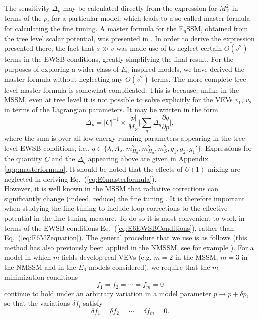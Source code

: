 \documentclass[preprint,amsmath,amssymb,aps,superscriptaddress,prd,showpacs,floatfix,nofootinbib]{revtex4-1}
\newcommand{\be}{\begin{equation}}
\newcommand{\ee}{\end{equation}}
\begin{document}
The sensitivity $\Delta_p$ may be calculated directly
from the expression for $M_Z^2$ in terms of the $p_i$ for a particular
model, which leads to a so-called master formula for calculating the
fine tuning. A master formula for the E$_6$SSM, obtained from the tree
level scalar potential, was presented in \cite{Athron:2013ipa}. In
order to derive the expression presented there, the fact that $s \gg
v$ was made use of to neglect certain $O(v^2)$ terms in the EWSB
conditions, greatly simplifying the final result. For the purposes of
exploring a wider class of $E_6$ inspired models, we have derived
the master formula without neglecting any $O(v^2)$ terms. The more
complete tree-level master formula is somewhat complicated. This is
because, unlike in the MSSM, even at tree level it is not possible to
solve explicitly for the VEVs $v_1$, $v_2$ in terms of the Lagrangian
parameters. It may be written in the form \be \Delta_p=|C|^{-1}\times
\frac{|p|}{M_Z}\bigg|\sum_{q}\tilde{\Delta}_q\frac{\partial
  q}{\partial p}\bigg|,
\label{eq:E6masterformula}
\ee where the sum is over all low energy running parameters appearing
in the tree level EWSB conditions, i.e., $q\in\{\lambda, A_\lambda,
m_{H_d}^2,m_{H_u}^2,m_S^2,g_1,g_2,g_1'\}$. Expressions for the
quantity $C$ and the $\tilde{\Delta}_q$ appearing above are given in
Appendix \ref{app:masterformula}. It should be noted that the effects
of $U(1)$ mixing are neglected in deriving
Eq.~(\ref{eq:E6masterformula}).\\
However, it is well known in the
MSSM that radiative corrections can significantly change (indeed,
reduce) the fine tuning \cite{Cassel:2010px}. It is therefore
important when studying the fine tuning to include loop corrections to
the effective potential in the fine tuning measure. To do so it is
most convenient to work in terms of the EWSB conditions
Eq.~(\ref{eq:E6EWSBConditions}), rather than
Eq.~(\ref{eq:E6MZequation}). The general procedure that we use is as follows
(this method has also previously been applied in the NMSSM, see for example \cite{Ellwanger:2011mu}). For a model in which $m$ fields develop real
VEVs (e.g. $m=2$ in the MSSM, $m=3$ in the NMSSM and in the $E_6$
models considered), we require that the $m$ minimization conditions
\begin{equation}\label{eq:EWSBconditions}
f_1=f_2=\dotsb=f_m=0
\end{equation}
continue to hold under an arbitrary variation in a model parameter
$p\rightarrow p+\delta p$, so that the variations $\delta f_i$ satisfy
\begin{equation}\label{eq:EWSBvariations}
\delta f_1 = \delta f_2=\dotsb =\delta f_m =0.
\end{equation}
\end{document}
